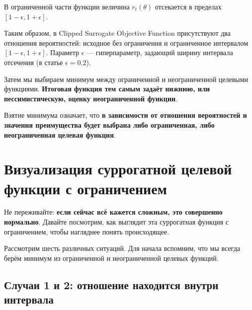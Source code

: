\documentclass[11pt,a4paper]{article}
\begin{document}

В ограниченной части функции величина \(r_t(\theta)\) отсекается в пределах \([1 - \epsilon, 1 + \epsilon]\).

Таким образом, в Clipped Surrogate Objective Function присутствуют два отношения вероятностей: исходное без ограничения и ограниченное интервалом \([1 - \epsilon, 1 + \epsilon]\). Параметр \(\epsilon\) --- гиперпараметр, задающий ширину интервала отсечения (в статье \(\epsilon = 0.2\)).

Затем мы выбираем минимум между ограниченной и неограниченной целевыми функциями. \textbf{Итоговая функция тем самым задаёт нижнюю, или пессимистическую, оценку неограниченной функции}.

Взятие минимума означает, что \textbf{в зависимости от отношения вероятностей и значения преимущества будет выбрана либо ограниченная, либо неограниченная целевая функция}.

\section{Визуализация суррогатной целевой функции с ограничением}\label{visualize-the-clipped-surrogate-objective-function}

Не переживайте: \textbf{если сейчас всё кажется сложным, это совершенно нормально}. Давайте посмотрим, как выглядит эта суррогатная функция с ограничением, чтобы нагляднее понять происходящее.


Рассмотрим шесть различных ситуаций. Для начала вспомним, что мы всегда берём минимум из ограниченной и неограниченной целевых функций.

\subsection{Случаи 1 и 2: отношение находится внутри интервала}\label{case-1-and-2-the-ratio-is-between-the-range}
\end{document}
